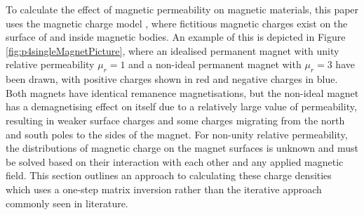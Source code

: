 To calculate the effect of magnetic permeability on magnetic materials, this paper uses the magnetic charge model \cite{Furlani2001}, where fictitious magnetic charges exist on the surface of and inside magnetic bodies. An example of this is depicted in Figure \ref{fig:p4singleMagnetPicture}, where an idealised permanent magnet with unity relative permeability \(\mu_r = 1\) and a non-ideal permanent magnet with \(\mu_r = 3\) have been drawn, with positive charges shown in red and negative charges in blue. Both magnets have identical remanence magnetisations, but the non-ideal magnet has a demagnetising effect on itself due to a relatively large value of permeability, resulting in weaker surface charges and some charges migrating from the north and south poles to the sides of the magnet. For non-unity relative permeability, the distributions of magnetic charge on the magnet surfaces is unknown and must be solved based on their interaction with each other and any applied magnetic field. This section outlines an approach to calculating these charge densities which uses a one-step matrix inversion rather than the iterative approach commonly seen in literature.
